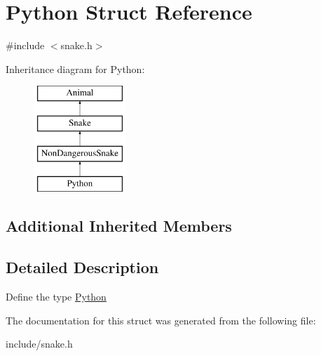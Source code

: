 \hypertarget{structPython}{}\section{Python Struct Reference}
\label{structPython}


{\ttfamily \#include $<$snake.\+h$>$}

Inheritance diagram for Python\+:\begin{figure}[H]
\begin{center}
\leavevmode
\includegraphics[height=4.000000cm]{structPython}
\end{center}
\end{figure}
\subsection*{Additional Inherited Members}


\subsection{Detailed Description}
Define the type \hyperlink{structPython}{Python} 

The documentation for this struct was generated from the following file\+:\begin{DoxyCompactItemize}
\item 
include/snake.\+h\end{DoxyCompactItemize}

